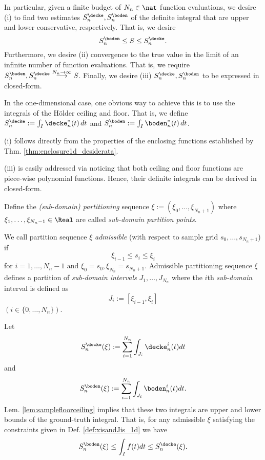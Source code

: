 In particular, given a finite budget of ${N_n} \in \nat$ function evaluations, we desire (i) to find two  estimates $S^\decke_n , S^\boden_n$ of the definite integral that are upper and lower conservative, respectively. That is, we desire 
\[S^\boden_n \leq S \leq S^\decke_n. \] Furthermore, we desire (ii) convergence to the true value in the limit of an infinite number of function evaluations. That is, we require
$S^\boden_n, S^\decke_n \stackrel{{N_n} \to \infty}{\longrightarrow} S $.
Finally, we desire (iii) $S^\decke_n,S^\boden_n$ to be expressed in closed-form. 

In the one-dimensional case, one obvious way to achieve this is to use the integrals of the H\"older ceiling and floor. That is, we define $S^\decke_n := \int_I \decke_n^* (t) \,dt $ and $S^\boden_n := \int_I \boden_n^* (t) \,dt $. 

(i) follows directly from the properties of the enclosing functions established by Thm. \ref{thm:enclosure1d_desiderata}.

 (iii) is easily addressed via noticing that both ceiling and floor functions are piece-wise polynomial functions. 
 Hence, their definite integrals can be derived in closed-form.  



 Define the \emph{(sub-domain) partitioning} sequence $\xi:=(\xi_0,\ldots,\xi_{{N_n}+1})$ where
$\xi_1, \ldots, \xi_{{N_n}-1} \in \Real$ are called \emph{sub-domain partition points}. 

\begin{defn}\label{def:xisandJis_1d}
We call partition sequence $\xi$ \emph{admissible} (with respect to sample grid $s_0,\ldots,s_{{N_n}+1}$) if  \[\xi_{i-1} \leq s_i  \leq \xi_{i} \] for $i=1,\ldots,{N_n}-1\text{ and }\xi_0 = s_0, \xi_{N_n} = s_{{N_n}+1}$.
Admissible partitioning sequence $\xi$ defines a partition of \emph{sub-domain intervals} $J_1,\ldots,J_{N_n}$ where the $i$th \emph{sub-domain} interval is defined as \[J_i := [\xi_{i-1},\xi_{i}]\]  $(i \in \{0,\ldots,{N_n}\})$. 

\end{defn}
\begin{rem}
Let  \[S^\decke_n (\xi) := \sum_{i=1}^{N_n} \int_{J_i} \decke^i_n (t) dt \] and 
\[S^\boden_n (\xi) := \sum_{i=1}^{N_n} \int_{J_i} \boden^i_n (t) dt. \]
Lem. \ref{lem:samplefloorceiling} implies that these two integrals are upper and lower bounds of the ground-truth integral. That is, for any admissible $\xi$ satisfying the constraints given in Def. \ref{def:xisandJis_1d} we have
\[S^\boden_n(\xi) \leq \int_I f(t) dt \leq S^\decke_n(\xi). \]
\end{rem}

